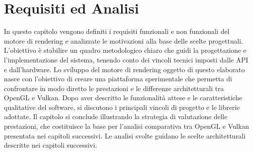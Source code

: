 \documentclass[12pt,a4paper,openright,twoside]{book}
\begin{document}
\chapter{Requisiti ed Analisi}
\label{chap:analisi}
\noindent
In questo capitolo vengono definiti i requisiti funzionali e non funzionali del motore di rendering 
e analizzate le motivazioni alla base delle scelte progettuali.
L'obiettivo è stabilire un quadro metodologico chiaro che guidi la progettazione e l'implementazione del sistema,
tenendo conto dei vincoli tecnici imposti dalle API e dall'hardware.
Lo sviluppo del motore di rendering oggetto di questo elaborato nasce con l'obiettivo di creare una piattaforma
sperimentale che permetta di confrontare in modo diretto le prestazioni e le differenze architetturali tra
OpenGL e Vulkan.
Dopo aver descritto le funzionalità attese e le caratteristiche qualitative del software,
si discutono i principali vincoli di progetto e le librerie adottate.
Il capitolo si conclude illustrando la strategia di valutazione delle prestazioni,
che costituisce la base per l'analisi comparativa tra OpenGL e Vulkan presentata nei capitoli successivi.
Le analisi svolte guidano le scelte architetturali descritte nei capitoli successivi.
\end{document}

